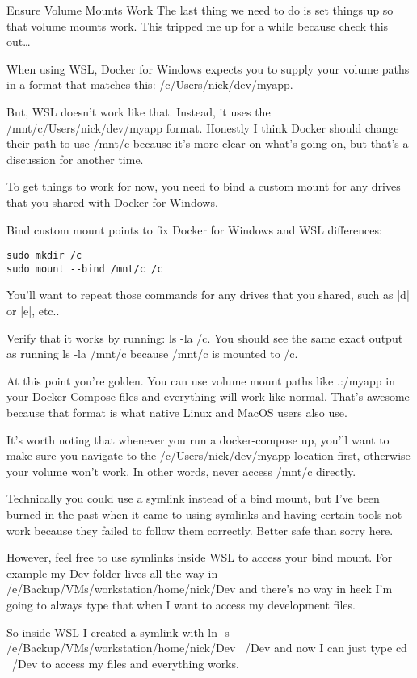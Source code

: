 Ensure Volume Mounts Work
The last thing we need to do is set things up so that volume mounts work. This tripped me up for a while because check this out…

When using WSL, Docker for Windows expects you to supply your volume paths in a format that matches this: /c/Users/nick/dev/myapp.

But, WSL doesn’t work like that. Instead, it uses the /mnt/c/Users/nick/dev/myapp format. Honestly I think Docker should change their path to use /mnt/c because it’s more clear on what’s going on, but that’s a discussion for another time.

To get things to work for now, you need to bind a custom mount for any drives that you shared with Docker for Windows.

Bind custom mount points to fix Docker for Windows and WSL differences:

\begin{verbatim}
sudo mkdir /c
sudo mount --bind /mnt/c /c
\end{verbatim}


You’ll want to repeat those commands for any drives that you shared, such as |d| or |e|, etc..

Verify that it works by running: ls -la /c. You should see the same exact output as running ls -la /mnt/c because /mnt/c is mounted to /c.

At this point you’re golden. You can use volume mount paths like .:/myapp in your Docker Compose files and everything will work like normal. That’s awesome because that format is what native Linux and MacOS users also use.

It’s worth noting that whenever you run a docker-compose up, you’ll want to make sure you navigate to the /c/Users/nick/dev/myapp location first, otherwise your volume won’t work. In other words, never access /mnt/c directly.

Technically you could use a symlink instead of a bind mount, but I’ve been burned in the past when it came to using symlinks and having certain tools not work because they failed to follow them correctly. Better safe than sorry here.

However, feel free to use symlinks inside WSL to access your bind mount. For example my Dev folder lives all the way in /e/Backup/VMs/workstation/home/nick/Dev and there’s no way in heck I’m going to always type that when I want to access my development files.

So inside WSL I created a symlink with ln -s /e/Backup/VMs/workstation/home/nick/Dev ~/Dev and now I can just type cd ~/Dev to access my files and everything works.

